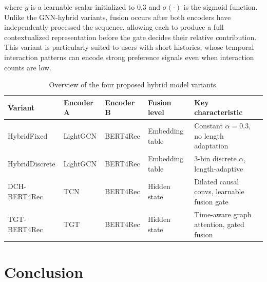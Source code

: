 \documentclass[12pt,a4paper]{report}
\begin{document}
\noindent where \(g\) is a learnable scalar initialized to \(0.3\) and
\(\sigma(\cdot)\) is the sigmoid function. Unlike the GNN-hybrid variants,
fusion occurs after both encoders have independently processed the sequence,
allowing each to produce a full contextualized representation before the gate
decides their relative contribution. This variant is particularly suited to
users with short histories, whose temporal interaction patterns can encode
strong preference signals even when interaction counts are low.

\begin{table}[h]
\centering
\caption{Overview of the four proposed hybrid model variants.}
\label{tab:model_family}
\begin{tabular}{p{2.2cm} p{2.5cm} p{2.5cm} p{2.2cm} p{3.3cm}}
\toprule
\textbf{Variant} & \textbf{Encoder A} & \textbf{Encoder B} & \textbf{Fusion level} & \textbf{Key characteristic} \\
\midrule
HybridFixed   & LightGCN  & BERT4Rec & Embedding table & Constant \(\alpha = 0.3\), no length adaptation \\
HybridDiscrete & LightGCN & BERT4Rec & Embedding table & 3-bin discrete \(\alpha\), length-adaptive \\
DCH-BERT4Rec  & TCN       & BERT4Rec & Hidden state    & Dilated causal convs, learnable fusion gate \\
TGT-BERT4Rec  & TGT       & BERT4Rec & Hidden state    & Time-aware graph attention, gated fusion \\
\bottomrule
\end{tabular}
\end{table}

\section{Conclusion}
\label{sec:ch2conclusion}
\end{document}
